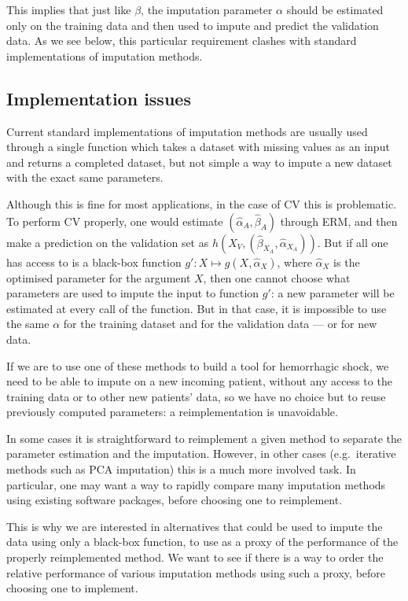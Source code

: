 This implies that just like $\beta$, the imputation parameter $\alpha$ should be estimated only on the training data and then used to impute and predict the validation data. As we see below, this particular requirement clashes with standard implementations of imputation methods.

		\subsection{Implementation issues}
Current standard implementations of imputation methods are usually used through a single function which takes a dataset with missing values as an input and returns a completed dataset, but not simple a way to impute a new dataset with the exact same parameters. \cite{stekhoven2015missforest} \cite{josse2016missmda}\cite{MICE_founding}\cite{ref_amelia}

Although this is fine for most applications, in the case of CV this is problematic. To perform CV properly, one would estimate $(\hat{\alpha}_A, \hat{\beta}_A)$ through ERM, and then make a prediction on the validation set as $h(X_V,(\hat{\beta}_{X_A},\hat{\alpha}_{X_A}))$. But if all one has access to is a black-box function $g': X \mapsto g(X, \hat{\alpha}_X)$, where $\hat{\alpha}_X$ is the optimised parameter for the argument $X$, then one cannot choose what parameters are used to impute the input to function $g'$: a new parameter will be estimated at every call of the function. But in that case, it is impossible to use the same $\alpha$ for the training dataset and for the validation data --- or for new data.

If we are to use one of these methods to build a tool for hemorrhagic shock, we need to be able to impute on a new incoming patient, without any access to the training data or to other new patients' data, so we have no choice but to reuse previously computed parameters: a reimplementation is unavoidable.

In some cases it is straightforward to reimplement a given method to separate the parameter estimation and the imputation. However, in other cases (e.g.\ iterative methods such as PCA imputation) this is a much more involved task. In particular, one may want a way to rapidly compare many imputation methods using existing software packages, before choosing one to reimplement. 

This is why we are interested in alternatives that could be used to impute the data using only a black-box function, to use as a proxy of the performance of the properly reimplemented method. We want to see if there is a way to order the relative performance of various imputation methods using such a proxy, before choosing one to implement.

